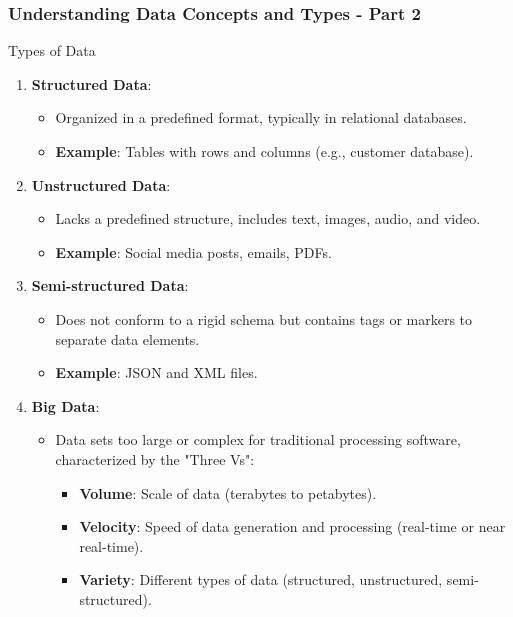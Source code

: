 \documentclass{beamer}
\begin{document}
\begin{frame}[fragile]
    \frametitle{Understanding Data Concepts and Types - Part 2}
    \begin{block}{Types of Data}
        \begin{enumerate}
            \item \textbf{Structured Data}:
            \begin{itemize}
                \item Organized in a predefined format, typically in relational databases.
                \item \textbf{Example}: Tables with rows and columns (e.g., customer database).
            \end{itemize}

            \item \textbf{Unstructured Data}:
            \begin{itemize}
                \item Lacks a predefined structure, includes text, images, audio, and video.
                \item \textbf{Example}: Social media posts, emails, PDFs.
            \end{itemize}

            \item \textbf{Semi-structured Data}:
            \begin{itemize}
                \item Does not conform to a rigid schema but contains tags or markers to separate data elements.
                \item \textbf{Example}: JSON and XML files.
            \end{itemize}

            \item \textbf{Big Data}:
            \begin{itemize}
                \item Data sets too large or complex for traditional processing software, characterized by the "Three Vs":
                \begin{itemize}
                    \item \textbf{Volume}: Scale of data (terabytes to petabytes).
                    \item \textbf{Velocity}: Speed of data generation and processing (real-time or near real-time).
                    \item \textbf{Variety}: Different types of data (structured, unstructured, semi-structured).
                \end{itemize}
            \end{itemize}
        \end{enumerate}
    \end{block}
\end{frame}
\end{document}
